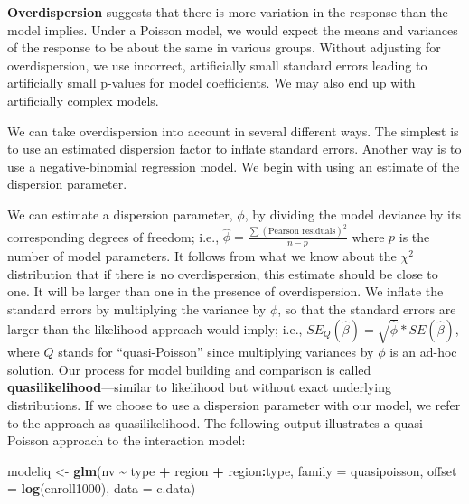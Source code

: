 \documentclass[
]{krantz}
\newenvironment{Shaded}{\begin{snugshade}}{\end{snugshade}}
\newcommand{\AttributeTok}[1]{\textcolor[rgb]{0.27,0.27,0.27}{#1}}
\newcommand{\FunctionTok}[1]{\textcolor[rgb]{0.27,0.27,0.27}{\textbf{#1}}}
\newcommand{\NormalTok}[1]{#1}
\newcommand{\OtherTok}[1]{\textcolor[rgb]{0.37,0.37,0.37}{#1}}
\newcommand{\SpecialCharTok}[1]{\textcolor[rgb]{0.43,0.43,0.43}{\textbf{#1}}}
\begin{document}
\textbf{Overdispersion}  suggests that there is more variation in the response than the model implies. Under a Poisson model, we would expect the means and variances of the response to be about the same in various groups. Without adjusting for overdispersion, we use incorrect, artificially small standard errors leading to artificially small p-values for model coefficients. We may also end up with artificially complex models.

We can take overdispersion into account in several different ways. The simplest is to use an estimated dispersion factor to inflate standard errors. Another way is to use a negative-binomial regression model. We begin with using an estimate of the dispersion parameter.

We can estimate a dispersion parameter, \(\phi\), by dividing the model deviance by its corresponding degrees of freedom; i.e., \(\hat\phi=\frac{\sum(\textrm{Pearson residuals})^2}{n-p}\) where \(p\) is the number of model parameters. It follows from what we know about the \(\chi^2\) distribution that if there is no overdispersion, this estimate should be close to one. It will be larger than one in the presence of overdispersion. We inflate the standard errors by multiplying the variance by \(\phi\), so that the standard errors are larger than the likelihood approach would imply; i.e., \(SE_Q(\hat\beta)=\sqrt{\hat\phi}*SE(\hat\beta)\), where \(Q\) stands for ``quasi-Poisson''  since multiplying variances by \(\phi\) is an ad-hoc solution. Our process for model building and comparison is called \textbf{quasilikelihood}---similar to likelihood but without exact underlying distributions.  If we choose to use a dispersion parameter with our model, we refer to the approach as quasilikelihood. The following output illustrates a quasi-Poisson approach to the interaction model:

\begin{Shaded}
\begin{Highlighting}[]
\NormalTok{modeliq }\OtherTok{\textless{}{-}} \FunctionTok{glm}\NormalTok{(nv }\SpecialCharTok{\textasciitilde{}}\NormalTok{ type }\SpecialCharTok{+}\NormalTok{ region }\SpecialCharTok{+}\NormalTok{ region}\SpecialCharTok{:}\NormalTok{type, }
               \AttributeTok{family =}\NormalTok{ quasipoisson,}
               \AttributeTok{offset =} \FunctionTok{log}\NormalTok{(enroll1000), }\AttributeTok{data =}\NormalTok{ c.data)}
\end{Highlighting}
\end{Shaded}
\end{document}
